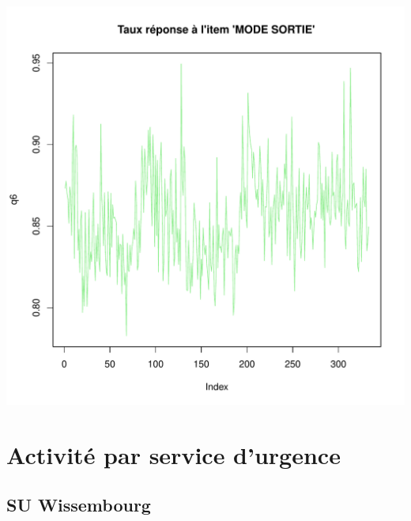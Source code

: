 \documentclass[12pt,english,french,twoside]{report}\usepackage[]{graphicx}\usepackage[]{color}
\makeatletter
\def\maxwidth{ %
  \ifdim\Gin@nat@width>\linewidth
    \linewidth
  \else
    \Gin@nat@width
  \fi
}
\makeatother
\begin{document}
\includegraphics[width=\maxwidth]{figure/retour_dom3} 




\part{Activité par service d'urgence}

\newpage

\chapter{SU Wissembourg}






\end{document}
